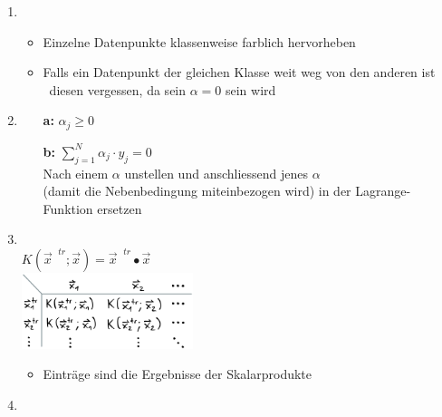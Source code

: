 \begin{enumerate}
    \item {} \\
    \begin{minipage}[c]{0.6\columnwidth}
        \begin{itemize}
            \item Einzelne Datenpunkte klassenweise farblich hervorheben
            \item Falls ein Datenpunkt der gleichen Klasse weit weg von den anderen ist\\
            \textrightarrow\ diesen vergessen, da sein $\alpha = 0$ sein wird
        \end{itemize}
    \end{minipage}\hfill
    \begin{minipage}[c]{0.33\columnwidth}
        
    \end{minipage}
    \columnbreak
    \item {}
    \begin{itemize}
        \item [\textbf{a:}] $\boxed{\alpha_j\geq0}$
        \item [\textbf{b:}] $\boxed{\sum_{j=1}^N\alpha_j \cdot y_j=0}$\\
        Nach einem $\alpha$ unstellen und anschliessend jenes $\alpha$\\(damit die Nebenbedingung miteinbezogen wird) in der Lagrange-Funktion ersetzen
    \end{itemize}
    \item {}\\
        $\boxed{K\left( \vec{x}^{\text{ $tr$}} ; \vec{x}\right) = \vec{x}^{\text{ $tr$}} \bullet \vec{x}}$\\
        \includegraphics[width=5cm]{images/kernel_matrix.png}
        \begin{itemize}
            \item Einträge sind die Ergebnisse der Skalarprodukte
        \end{itemize}
    \item {}\\

\end{enumerate}
